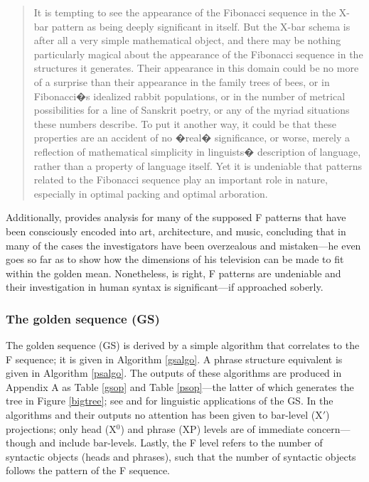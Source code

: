 \documentclass[11pt,twoside]{article}
\begin{document}
\begin{quotation}It is tempting to see the appearance of the Fibonacci sequence in the X-bar pattern as being deeply significant in itself. But the X-bar schema is after all a very simple mathematical object, and there may be nothing particularly magical about the appearance of the Fibonacci sequence in the structures it generates. Their appearance in this domain could be no more of a surprise than their appearance in the family trees of bees, or in Fibonacci�s idealized rabbit populations, or in the number of metrical possibilities for a line of Sanskrit poetry, or any of the myriad situations these numbers describe. To put it another way, it could be that these properties are an accident of no �real� significance, or worse, merely a reflection of mathematical simplicity in linguists� description of language, rather than a property of language itself. Yet it is undeniable that patterns related to the Fibonacci sequence play an important role in nature, especially in optimal packing and optimal arboration.\end{quotation}

Additionally, \cite{livio:2002} provides analysis for many of the supposed F patterns that have been consciously encoded into art, architecture, and music, concluding that in many of the cases the investigators have been overzealous and mistaken---he even goes so far as to show how the dimensions of his television can be made to fit within the golden mean. Nonetheless, \cite{medeiros:2008} is right, F patterns are undeniable and their investigation in human syntax is significant---if approached soberly.

\subsubsection{The golden sequence (GS)}
The golden sequence (GS) is derived by a simple algorithm that correlates to the F sequence; it is given in Algorithm \ref{gsalgo}. A phrase structure equivalent is given in Algorithm \ref{psalgo}. The outputs of these algorithms are produced in Appendix A as Table \ref{gsop} and Table \ref{psop}---the latter of which generates the tree in Figure \ref{bigtree}; see \cite{uriagereka:1998} and \cite{ppuriagereka:2008} for linguistic applications of the GS. In the algorithms and their outputs no attention has been given to bar-level (X$'$) projections; only head (X$^0$) and phrase (XP) levels are of immediate concern---though \cite{medeiros:2008} and \cite{soschen:2008} include bar-levels. Lastly, the F level refers to the number of syntactic objects (heads and phrases), such that the number of syntactic objects follows the pattern of the F sequence. 
\end{document}
